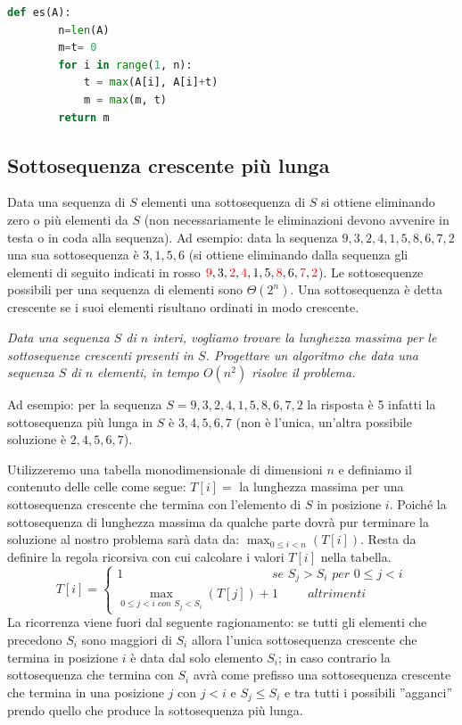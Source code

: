 \begin{lstlisting}[language=Python]
    def es(A):
        n=len(A)
        m=t= 0
        for i in range(1, n):
            t = max(A[i], A[i]+t)
            m = max(m, t)
        return m
\end{lstlisting}

\subsection{Sottosequenza crescente più lunga}
Data una sequenza di $S$ elementi una sottosequenza di $S$ si ottiene eliminando zero o più elementi da $S$ (non necessariamente le eliminazioni devono avvenire in testa o in coda alla sequenza). Ad esempio: data la sequenza $9, 3, 2, 4, 1, 5, 8, 6, 7, 2$ una sua sottosequenza è $3, 1, 5, 6$ (si ottiene eliminando dalla sequenza gli elementi di seguito indicati in rosso $\textcolor{red}{9},3,\textcolor{red}{2},\textcolor{red}{4},1,5,\textcolor{red}{8},6,\textcolor{red}{7},\textcolor{red}{2}$). Le sottosequenze possibili per una sequenza di elementi sono $\Theta(2^n)$. Una sottosequenza è detta crescente se i suoi elementi risultano ordinati in modo crescente.

\textit{Data una sequenza $S$ di $n$ interi, vogliamo trovare la lunghezza massima per le sottosequenze crescenti presenti in $S$. Progettare un algoritmo che data una sequenza $S$ di $n$ elementi, in tempo $O(n^2)$ risolve il problema.}

Ad esempio: per la sequenza $S = 9, 3, 2, 4, 1, 5, 8, 6, 7, 2$ la risposta è 5 infatti la sottosequenza più lunga in $S$ è $3, 4, 5, 6, 7$ (non è l'unica, un'altra possibile soluzione è $2, 4, 5, 6, 7$).

Utilizzeremo una tabella monodimensionale di dimensioni $n$ e definiamo il contenuto delle celle come segue: $T[i] =$ la lunghezza massima per una sottosequenza crescente che termina con l’elemento di $S$ in posizione $i$. Poiché la sottosequenza di lunghezza massima da qualche parte dovrà pur terminare la soluzione al nostro problema sarà data da: $\max_{0\leq i<n}(T[i])$. Resta da definire la regola ricorsiva con cui calcolare i valori $T[i]$ nella tabella.
\begin{equation*}T[i]=
    \begin{cases}
        1\hspace{5cm}\textit{se }S_j>S_i\textit{ per }0\leq j<i\\
        \max_{0\leq j<i\textit{ con }S_j<S_i}(T[j])+1\hspace{1cm}\textit{altrimenti}
    \end{cases}
\end{equation*}
La ricorrenza viene fuori dal seguente ragionamento: se tutti gli elementi che precedono $S_i$ sono maggiori di $S_i$ allora l’unica sottosequenza crescente che termina in posizione $i$ è data dal solo elemento $S_i$; in caso contrario la sottosequenza che termina con $S_i$ avrà come prefisso una sottosequenza crescente che termina in una posizione $j$ con $j<i$ e $S_j \leq S_i$ e tra tutti i possibili ”agganci” prendo quello che produce la sottosequenza più lunga.

